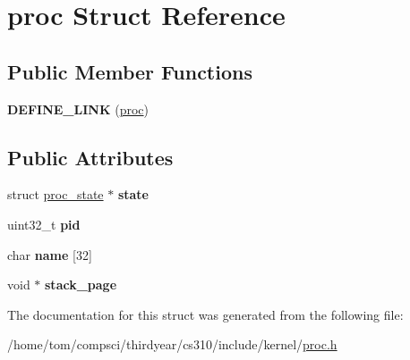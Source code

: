 \hypertarget{structproc}{}\section{proc Struct Reference}
\label{structproc}
\subsection*{Public Member Functions}
\begin{DoxyCompactItemize}
\item 
\mbox{\label{structproc_a25507e8e40b716c1f18ab35450bd1785}} 
{\bfseries D\+E\+F\+I\+N\+E\+\_\+\+L\+I\+NK} (\mbox{\hyperlink{structproc}{proc}})
\end{DoxyCompactItemize}
\subsection*{Public Attributes}
\begin{DoxyCompactItemize}
\item 
\mbox{\label{structproc_a84ee6818830e5218df0600b49eb59f91}} 
struct \mbox{\hyperlink{structproc__state}{proc\+\_\+state}} $\ast$ {\bfseries state}
\item 
\mbox{\label{structproc_a67544ca267b9459de04f0d4e8e39e780}} 
uint32\+\_\+t {\bfseries pid}
\item 
\mbox{\label{structproc_ae57eaab0c0b272a2e6c727aec204ac2b}} 
char {\bfseries name} \mbox{[}32\mbox{]}
\item 
\mbox{\label{structproc_a07f70c85082904039f1ccaa4fcb8c402}} 
void $\ast$ {\bfseries stack\+\_\+page}
\end{DoxyCompactItemize}


The documentation for this struct was generated from the following file\+:\begin{DoxyCompactItemize}
\item 
/home/tom/compsci/thirdyear/cs310/include/kernel/\mbox{\hyperlink{proc_8h}{proc.\+h}}\end{DoxyCompactItemize}
